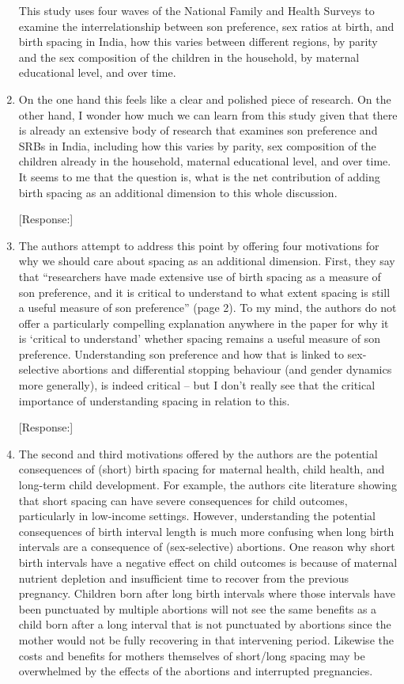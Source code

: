 \documentclass[letterpaper,12pt]{article}
\begin{document}
\begin{enumerate}

This study uses four waves of the National Family and Health Surveys to
examine the interrelationship between son preference, sex ratios at
birth, and birth spacing in India, how this varies between different
regions, by parity and the sex composition of the children in the
household, by maternal educational level, and over time.


\item On the one hand this feels like a clear and polished piece of
research. On the other hand, I wonder how much we can learn from this
study given that there is already an extensive body of research that
examines son preference and SRBs in India, including how this varies by
parity, sex composition of the children already in the household,
maternal educational level, and over time. It seems to me that the
question is, what is the net contribution of adding birth spacing as an
additional dimension to this whole discussion.

[Response:]


\item The authors attempt to address this point by offering four motivations
for why we should care about spacing as an additional dimension. First,
they say that “researchers have made extensive use of birth spacing as a
measure of son preference, and it is critical to understand to what
extent spacing is still a useful measure of son preference” (page 2). To
my mind, the authors do not offer a particularly compelling explanation
anywhere in the paper for why it is ‘critical to understand’ whether
spacing remains a useful measure of son preference. Understanding son
preference and how that is linked to sex-selective abortions and
differential stopping behaviour (and gender dynamics more generally), is
indeed critical – but I don’t really see that the critical importance of
understanding spacing in relation to this.

[Response:]


\item The second and third motivations offered by the authors are the
potential consequences of (short) birth spacing for maternal health,
child health, and long-term child development. For example, the authors
cite literature showing that short spacing can have severe consequences
for child outcomes, particularly in low-income settings. However,
understanding the potential consequences of birth interval length is
much more confusing when long birth intervals are a consequence of
(sex-selective) abortions. One reason why short birth intervals have a
negative effect on child outcomes is because of maternal nutrient
depletion and insufficient time to recover from the previous pregnancy.
Children born after long birth intervals where those intervals have been
punctuated by multiple abortions will not see the same benefits as a
child born after a long interval that is not punctuated by abortions
since the mother would not be fully recovering in that intervening
period. Likewise the costs and benefits for mothers themselves of
short/long spacing may be overwhelmed by the effects of the abortions
and interrupted pregnancies.


\end{enumerate}
\end{document}
